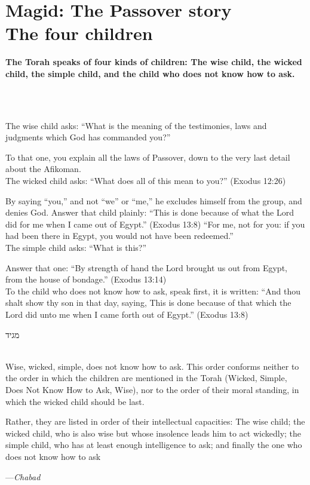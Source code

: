\documentclass[a4paper,12pt,openany]{memoir}
\newcommand{\HgSource}[1]{\hfill{\small---\itshape{#1}}}
\newcommand{\hchapter}[1]{
  \begin{hebrew}
    \begin{Spacing}{.97}
      \newpage
      \strut

      \vspace{.15em}

      \noindent\Huge #1

      \vspace{1em}
    \end{Spacing}
  \end{hebrew}
}
\newcommand{\HgHL}[1]{{\Large\textbf{#1}\par\noindent\\[-.5em]}}
\newenvironment{HgEnglish}{\strut\\\noindent}{\vspace{1em}}
\newcommand{\LSrc}{\textsuperscript{\upshape{[L]}}}
\begin{document}
\vfill

\chapter*{Magid: The Passover story \\ {\LARGE The four children}}

\vfill

\HgHL{The Torah speaks of four kinds of children: The wise child, the wicked
  child, the simple child, and the child who does not know how to ask.}\\
The wise child asks: ``What is the meaning of the testimonies, laws and
judgments which God has commanded you?''

To that one, you explain all the laws of Passover, down to the very last detail
about the Afikoman. \\[1em]
The wicked child asks: ``What does all of this mean to you?'' (Exodus 12:26)

By saying ``you,'' and not ``we'' or ``me,'' he excludes himself from the group,
and denies God. Answer that child plainly: ``This is done because of what the
Lord did for me when I came out of Egypt.'' (Exodus 13:8) ``For me, not for you:
if you had been there in Egypt, you would not have been redeemed.''\\[1em]
The simple child asks: ``What is this?'' 

Answer that one: ``By strength of hand the Lord brought us out from Egypt, from
the house of bondage.'' (Exodus 13:14)\\[1em]
To the child who does not know how to ask, speak first, it is written: ``And
thou shalt show thy son in that day, saying, This is done because of that which
the Lord did unto me when I came forth out of Egypt.'' (Exodus 13:8) \LSrc

\vfill

\hchapter{מגיד}

\begin{HgEnglish}
Wise, wicked, simple, does not know how to ask. This order conforms neither to
the order in which the children are mentioned in the Torah (Wicked, Simple, Does
Not Know How to Ask, Wise), nor to the order of their moral standing, in which
the wicked child should be last.

Rather, they are listed in order of their intellectual capacities: The wise
child; the wicked child, who is also wise but whose insolence leads him to act
wickedly; the simple child, who has at least enough intelligence to ask; and
finally the one who does not know how to ask

\HgSource{Chabad}
\end{HgEnglish}
\end{document}
